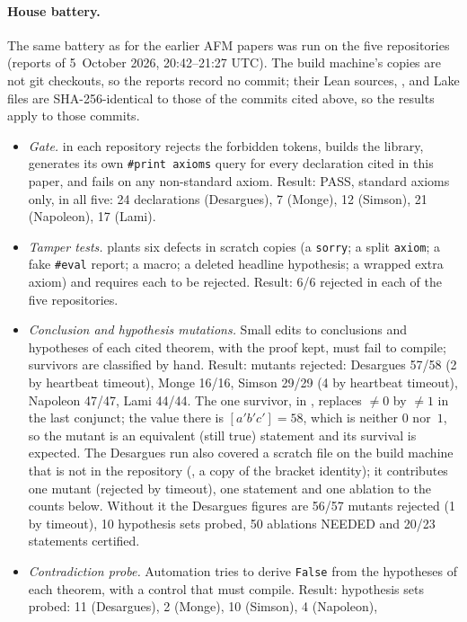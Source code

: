 \documentclass[11pt]{article}
\theoremstyle{definition}
\theoremstyle{remark}
\newcommand{\lean}[1]{\texttt{#1}}
\begin{document}
\paragraph{House battery.} The same battery as for the earlier AFM papers was run on the
five repositories (reports of 5~October 2026, 20:42--21:27 UTC). The build machine's copies are not
git checkouts, so the reports record no commit; their Lean sources, ,
 and Lake files are SHA-256-identical to those of the commits cited above, so
the results apply to those commits.
\begin{itemize}
\item \emph{Gate.}  in each repository rejects the forbidden tokens, builds the
library, generates its own \lean{\#print axioms} query for every declaration cited in this paper,
and fails on any non-standard axiom.
Result: PASS, standard axioms only, in all five: 24 declarations (Desargues), 7 (Monge),
12 (Simson), 21 (Napoleon), 17 (Lami).
\item \emph{Tamper tests.}  plants six defects in scratch copies (a
\lean{sorry}; a split \lean{axiom}; a fake \lean{\#eval} report; a macro; a deleted headline
hypothesis; a wrapped extra axiom) and requires each to be rejected.
Result: 6/6 rejected in each of the five repositories.
\item \emph{Conclusion and hypothesis mutations.} Small edits to conclusions and hypotheses of
each cited theorem, with the proof kept, must fail to compile; survivors are classified by hand.
Result: mutants rejected: Desargues 57/58 (2 by heartbeat timeout), Monge 16/16, Simson 29/29
(4 by heartbeat timeout), Napoleon 47/47, Lami 44/44. The one survivor, in
, replaces $\ne0$ by $\ne1$ in the last conjunct; the value there
is $[a'b'c']=58$, which is neither $0$ nor~$1$, so the mutant is an equivalent (still true)
statement and its survival is expected. The Desargues run also covered a scratch file on the
build machine that is not in the repository (, a copy of the bracket identity); it
contributes one mutant (rejected by timeout), one statement and one ablation to the counts below.
Without it the Desargues figures are 56/57 mutants rejected (1 by timeout), 10 hypothesis sets
probed, 50 ablations NEEDED and 20/23 statements certified.
\item \emph{Contradiction probe.} Automation tries to derive \lean{False} from the hypotheses of
each theorem, with a control that must compile.
Result: hypothesis sets probed: 11 (Desargues), 2 (Monge), 10 (Simson), 4 (Napoleon),

\end{itemize}
\end{document}
